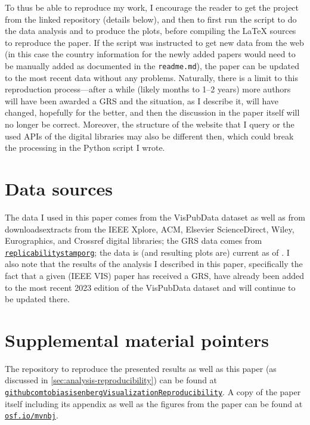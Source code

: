 \documentclass[conference,svgnames]{vgtc}                     %
\newcommand{\osfid}{mvnbj}
\begin{document}
To thus be able to reproduce my work, I encourage the reader to get the project from the linked repository (details below), and then to first run the script to do the data analysis and to produce the plots, before compiling the \LaTeX{} sources to reproduce the paper. If the script was instructed to get new data from the web (in this case the country information for the newly added papers would need to be manually added as documented in the \texttt{readme.md}), the paper can be updated to the most recent data without any problems. Naturally, there is a limit to this reproduction process---after a while (likely months to 1--2 years) more authors will have been awarded a GRS and the situation, as I describe it, will have changed, hopefully for the better, and then the discussion in the paper itself will no longer be correct. Moreover, the structure of the website that I query or the used APIs of the digital libraries may also be different then, which could break the processing in the Python script I wrote.

\section*{Data sources}
\label{sec:data_sources}

The data I used in this paper comes from the VisPubData dataset \cite{Isenberg:2017:VMC} as well as from down\-loads\discretionary{/}{}{/}ex\-tracts from the IEEE Xplore, ACM, Elsevier ScienceDirect, Wiley, Eurographics, and Crossref digital libraries; the GRS data comes from \href{https://www.replicabilitystamp.org/}{\texttt{replicabilitystamporg}}; the data is (and resulting plots are) current as of \GrsiDataCurrentAsOf{}. I also note that the results of the analysis I described in this paper, specifically the fact that a given (IEEE VIS) paper has received a GRS, have already been added to the most recent 2023 edition of the VisPubData dataset \cite{Isenberg:2017:VMC} and will continue to be updated there.

\section*{Supplemental material pointers}
\label{sec:supplemental_materials}

The repository to reproduce the presented results as well as this paper (as discussed in \autoref{sec:analysis-reproducibility}) can be found at \href{https://github.com/tobiasisenberg/Visualization-Reproducibility}{\texttt{githubcom\discretionary{/}{}{/}tobiasisenberg\discretionary{/}{}{/}Visualization\discretionary{}{-}{-}Reproducibility}}. A copy of the paper itself including its appendix as well as the figures from the paper can be found at \href{https://osf.io/\osfid/}{\texttt{osf.io/\osfid}}.
\end{document}
